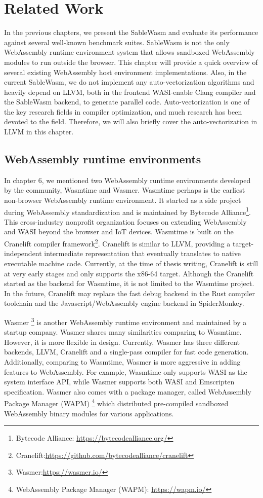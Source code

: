 \chapter{Related Work}

In the previous chapters, we present the SableWasm and evaluate its performance against several well-known benchmark suites. SableWasm is not the only WebAssembly runtime environment system that allows sandboxed WebAssembly modules to run outside the browser. This chapter will provide a quick overview of several existing  WebAssembly host environment implementations. Also, in the current SableWasm, we do not implement any auto-vectorization algorithms and heavily depend on LLVM, both in the frontend WASI-enable Clang compiler and the SableWasm backend, to generate parallel code.  Auto-vectorization is one of the key research fields in compiler optimization, and much research has been devoted to the field. Therefore, we will also briefly cover the auto-vectorization in LLVM in this chapter.

\section{WebAssembly runtime environments}

In chapter 6, we mentioned two WebAssembly runtime environments developed by the community, Wasmtime and Wasmer. Wasmtime perhaps is the earliest non-browser WebAssembly runtime environment. It started as a side project during WebAssembly standardization and is maintained by Bytecode Alliance\footnote{Bytecode Alliance: \url{https://bytecodealliance.org/}}. This cross-industry nonprofit organization focuses on extending WebAssembly and WASI beyond the browser and IoT devices. Wasmtime is built on the Cranelift compiler framework\footnote{Cranelift:\url{https://github.com/bytecodealliance/cranelift}}. Cranelift is similar to LLVM, providing a target-independent intermediate representation that eventually translates to native executable machine code. Currently, at the time of thesis writing, Cranelift is still at very early stages and only supports the x86-64 target. Although the Cranelift started as the backend for Wasmtime, it is not limited to the Wasmtime project. In the future, Cranelift may replace the fast debug backend in the Rust compiler toolchain and the Javascript/WebAssembly engine backend in SpiderMonkey.

Wasmer \footnote{Wasmer:\url{https://wasmer.io/}} is another WebAssembly runtime environment and maintained by a startup company. Wasmer shares many similarities comparing to Wasmtime. However, it is more flexible in design. Currently, Wasmer has three different backends, LLVM, Cranelift and a single-pass compiler for fast code generation. Additionally, comparing to Wasmtime, Wasmer is more aggressive in adding features to WebAssembly. For example, Wasmtime only supports WASI as the system interface API, while Wasmer supports both WASI and Emscripten specification. Wasmer also comes with a package manager, called WebAssembly Package Manager (WAPM) \footnote{WebAssembly Package Manager (WAPM): \url{https://wapm.io/}} which distributed pre-compiled sandboxed WebAssembly binary modules for various applications.

